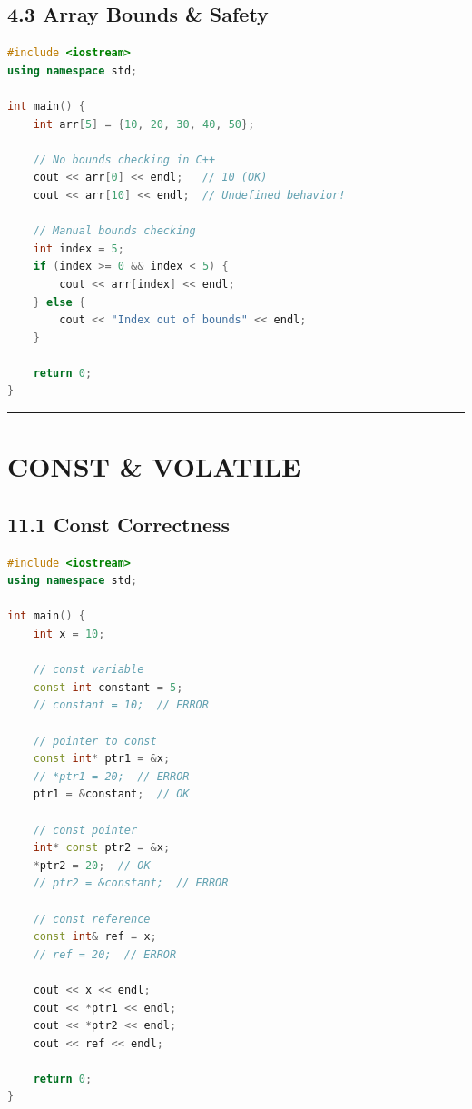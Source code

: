\hypertarget{array-bounds-safety}{%
\section{4.3 Array Bounds \& Safety}\label{array-bounds-safety}}

\begin{lstlisting}[language={C++}]
#include <iostream>
using namespace std;

int main() {
    int arr[5] = {10, 20, 30, 40, 50};
    
    // No bounds checking in C++
    cout << arr[0] << endl;   // 10 (OK)
    cout << arr[10] << endl;  // Undefined behavior!
    
    // Manual bounds checking
    int index = 5;
    if (index >= 0 && index < 5) {
        cout << arr[index] << endl;
    } else {
        cout << "Index out of bounds" << endl;
    }
    
    return 0;
}
\end{lstlisting}

\begin{center}\rule{0.5\linewidth}{0.5pt}\end{center}

\hypertarget{const-volatile}{%
\chapter{CONST \& VOLATILE}\label{const-volatile}}

\hypertarget{const-correctness}{%
\section{11.1 Const Correctness}\label{const-correctness}}

\begin{lstlisting}[language={C++}]
#include <iostream>
using namespace std;

int main() {
    int x = 10;
    
    // const variable
    const int constant = 5;
    // constant = 10;  // ERROR
    
    // pointer to const
    const int* ptr1 = &x;
    // *ptr1 = 20;  // ERROR
    ptr1 = &constant;  // OK
    
    // const pointer
    int* const ptr2 = &x;
    *ptr2 = 20;  // OK
    // ptr2 = &constant;  // ERROR
    
    // const reference
    const int& ref = x;
    // ref = 20;  // ERROR
    
    cout << x << endl;
    cout << *ptr1 << endl;
    cout << *ptr2 << endl;
    cout << ref << endl;
    
    return 0;
}
\end{lstlisting}

